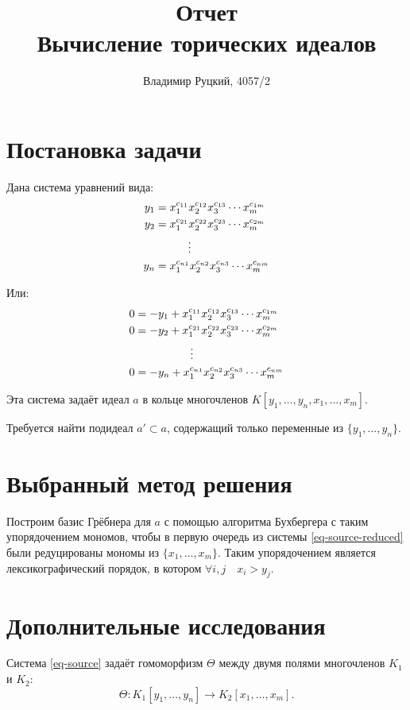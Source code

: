 \documentclass[a4paper,12pt]{article}
\title{Отчет \\ Вычисление торических идеалов}
\author{Владимир Руцкий, 4057/2}
\begin{document}
\maketitle

\section{Постановка задачи}
Дана система уравнений вида:
\begin{align}
  y_1    & = x_1^{c_{11}} x_2^{c_{12}} x_3^{c_{13}} \cdots x_m^{c_{1m}} \notag\\
  y_2    & = x_1^{c_{21}} x_2^{c_{22}} x_3^{c_{23}} \cdots x_m^{c_{2m}} \label{eq-source}\\
         & \quad\quad\quad \vdots \notag\\ %
  y_n    & = x_1^{c_{n1}} x_2^{c_{n2}} x_3^{c_{n3}} \cdots x_m^{c_{nm}} \notag
\end{align}

Или:
\begin{align}
   0 & = -y_1 + x_1^{c_{11}} x_2^{c_{12}} x_3^{c_{13}} \cdots x_m^{c_{1m}} \notag\\
   0 & = -y_2 + x_1^{c_{21}} x_2^{c_{22}} x_3^{c_{23}} \cdots x_m^{c_{2m}} \label{eq-source-reduced}\\
          & \quad\quad\quad\quad\quad \vdots \notag\\ %
   0 & = -y_n + x_1^{c_{n1}} x_2^{c_{n2}} x_3^{c_{n3}} \cdots x_m^{c_{nm}} \notag
\end{align}

Эта система задаёт идеал $a$ в кольце многочленов $K[y_1, \ldots, y_n, x_1, \ldots, x_m]$.

Требуется найти подидеал $a' \subset a$, содержащий только переменные из $\{y_1, \ldots, y_n\}$.

\section{Выбранный метод решения}
Построим базис Грёбнера для $a$ с помощью алгоритма Бухбергера с таким упорядочением мономов, 
чтобы в первую очередь из системы \eqref{eq-source-reduced} были редуцированы 
мономы из $\{x_1, \ldots, x_m\}$.
Таким упорядочением является лексикографический порядок, 
в котором $\forall i, j \quad x_i > y_j$.

\section{Дополнительные исследования}
Система \eqref{eq-source} задаёт гомоморфизм $\Theta$ между двумя полями многочленов $K_1$ и $K_2$:
$$\Theta: K_1[y_1, \ldots, y_n] \rightarrow K_2[x_1, \ldots, x_m].$$
\end{document}
